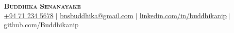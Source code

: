 

\begin{center}
    \textbf{\Huge \scshape Buddhika Senanayake} \\ \vspace{1pt}
    \small \href{tel:+94 71 234 5678}{+94 71 234 5678} $|$ \href{mailto:bnsbuddhika@gmail.com}{\underline{bnsbuddhika@gmail.com}} $|$ 
    \href{https://linkedin.com/in/buddhikanip}{\underline{linkedin.com/in/buddhikanip}} $|$
    \href{https://github.com/Buddhikanip}{\underline{github.com/Buddhikanip}}
\end{center}


    

        
